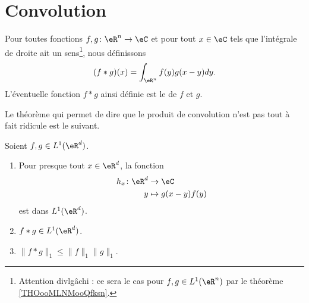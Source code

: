 \section{Convolution}


\begin{definition}      \label{DEFooHHCMooHzfStu}
    Pour toutes fonctions \( f,g\colon \eR^n\to \eC\) et pour tout \( x\in \eC\) tels que l'intégrale de droite ait un sens\footnote{Attention divlgâchi : ce sera le cas pour \( f,g\in L^1(\eR^n)\) par le théorème \ref{THOooMLNMooQfksn}.}, nous définissons
    \begin{equation}
        (f*g)(x)=\int_{\eR^n} f(y)g(x-y)dy.
    \end{equation}
    L'éventuelle fonction \( f*g\) ainsi définie est le  de \( f\) et \( g\).
\end{definition}

Le théorème qui permet de dire que le produit de convolution n'est pas tout à fait ridicule est le suivant.

\begin{theorem}     \label{THOooMLNMooQfksn}
    Soient \( f,g\in L^1(\eR^d)\).
    \begin{enumerate}
        \item
            Pour presque tout \( x\in \eR^d\), la fonction
            \begin{equation}
                \begin{aligned}
                    h_x\colon \eR^d&\to \eC \\
                    y&\mapsto g(x-y)f(y)
                \end{aligned}
            \end{equation}
            est dans \( L^1(\eR^d)\).
        \item
            \( f*g\in L^1(\eR^d)\).
        \item
            \( \| f*g \|_1\leq \| f \|_1\| g \|_1\).
    \end{enumerate}
\end{theorem}


